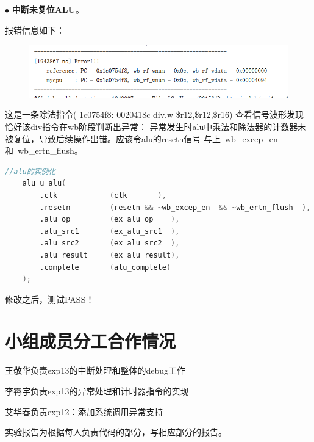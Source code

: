 \documentclass[11pt]{article}
\begin{document}
         \noindent
          $\bullet$
          \textbf{中断未复位ALU}。
        
          报错信息如下：
          \begin{figure}[H]
            \centering
            \includegraphics[width=15cm]{fig/26.png}
          \end{figure}
          这是一条除法指令( 1c0754f8:	0020418c 	div.w	\$r12,\$r12,\$r16)
          查看信号波形发现恰好该div指令在wb阶段判断出异常：
          异常发生时alu中乘法和除法器的计数器未被复位，导致后续操作出错。应该令alu的resetn信号
          与上~wb_excep_en和~wb_ertn_flush。
           \begin{lstlisting}[language=verilog]
            //alu的实例化
    alu u_alu(
        .clk            (clk       ),
        .resetn         (resetn && ~wb_excep_en  && ~wb_ertn_flush  ),
        .alu_op         (ex_alu_op    ),
        .alu_src1       (ex_alu_src1  ),
        .alu_src2       (ex_alu_src2  ),
        .alu_result     (ex_alu_result),
        .complete       (alu_complete)
    );
          \end{lstlisting}
          修改之后，测试PASS！

         

      
\vspace{1ex}

\section{小组成员分工合作情况}
王敬华负责exp13的中断处理和整体的debug工作

李霄宇负责exp13的异常处理和计时器指令的实现

艾华春负责exp12：添加系统调用异常支持

实验报告为根据每人负责代码的部分，写相应部分的报告。
\end{document}
